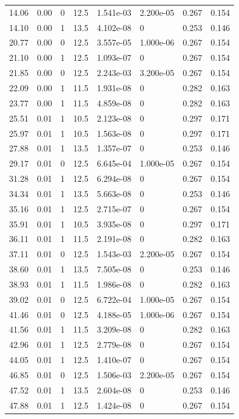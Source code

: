 \documentclass[preview]{standalone}
\begin{document}
{{\begin{tabular}{L{1.2cm}C{1.2cm} C{0.3cm}C{0.5cm} C{1.4cm}C{1.4cm} C{1.4cm}C{1.4cm}}
  14.06  &  0.00  & 0     & 12.5 &  1.541e-03  & 2.200e-05  & 0.267 &  0.154   \\ 
  14.10  &  0.00  & 1     & 13.5 &  4.102e-08  & 0  & 0.253 &  0.146   \\ 
  20.77  &  0.00  & 0     & 12.5 &  3.557e-05  & 1.000e-06  & 0.267 &  0.154   \\ 
  21.10  &  0.00  & 1     & 12.5 &  1.093e-07  & 0  & 0.267 &  0.154   \\ 
  21.85  &  0.00  & 0     & 12.5 &  2.243e-03  & 3.200e-05  & 0.267 &  0.154   \\ 
  22.09  &  0.00  & 1     & 11.5 &  1.931e-08  & 0  & 0.282 &  0.163   \\ 
  23.77  &  0.00  & 1     & 11.5 &  4.859e-08  & 0  & 0.282 &  0.163   \\ 
  25.51  &  0.01  & 1     & 10.5 &  2.123e-08  & 0  & 0.297 &  0.171   \\ 
  25.97  &  0.01  & 1     & 10.5 &  1.563e-08  & 0  & 0.297 &  0.171   \\ 
  27.88  &  0.01  & 1     & 13.5 &  1.357e-07  & 0  & 0.253 &  0.146   \\ 
  29.17  &  0.01  & 0     & 12.5 &  6.645e-04  & 1.000e-05  & 0.267 &  0.154   \\ 
  31.28  &  0.01  & 1     & 12.5 &  6.294e-08  & 0  & 0.267 &  0.154   \\ 
  34.34  &  0.01  & 1     & 13.5 &  5.663e-08  & 0  & 0.253 &  0.146   \\ 
  35.16  &  0.01  & 1     & 12.5 &  2.715e-07  & 0  & 0.267 &  0.154   \\ 
  35.91  &  0.01  & 1     & 10.5 &  3.935e-08  & 0  & 0.297 &  0.171   \\ 
  36.11  &  0.01  & 1     & 11.5 &  2.191e-08  & 0  & 0.282 &  0.163   \\ 
  37.11  &  0.01  & 0     & 12.5 &  1.543e-03  & 2.200e-05  & 0.267 &  0.154   \\ 
  38.60  &  0.01  & 1     & 13.5 &  7.505e-08  & 0  & 0.253 &  0.146   \\ 
  38.93  &  0.01  & 1     & 11.5 &  1.986e-08  & 0  & 0.282 &  0.163   \\ 
  39.02  &  0.01  & 0     & 12.5 &  6.722e-04  & 1.000e-05  & 0.267 &  0.154   \\ 
  41.46  &  0.01  & 0     & 12.5 &  4.188e-05  & 1.000e-06  & 0.267 &  0.154   \\ 
  41.56  &  0.01  & 1     & 11.5 &  3.209e-08  & 0  & 0.282 &  0.163   \\ 
  42.96  &  0.01  & 1     & 12.5 &  2.779e-08  & 0  & 0.267 &  0.154   \\ 
  44.05  &  0.01  & 1     & 12.5 &  1.410e-07  & 0  & 0.267 &  0.154   \\ 
  46.85  &  0.01  & 0     & 12.5 &  1.506e-03  & 2.200e-05  & 0.267 &  0.154   \\ 
  47.52  &  0.01  & 1     & 13.5 &  2.604e-08  & 0  & 0.253 &  0.146   \\ 
  47.88  &  0.01  & 1     & 12.5 &  1.424e-08  & 0  & 0.267 &  0.154   \\ 
\hline 
\end{tabular} 

}}
\end{document}
